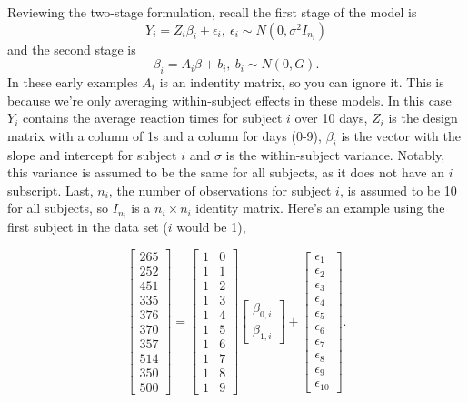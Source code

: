 \documentclass[
]{book}
\begin{document}
Reviewing the two-stage formulation, recall the first stage of the model is \[Y_i = Z_i\beta_i + \epsilon_i, \: \epsilon_i\sim N(0, \sigma^2I_{n_i})\] and the second stage is \[\beta_i = A_i \beta + b_i, \: b_i \sim N(0,G).\] In these early examples \(A_i\) is an indentity matrix, so you can ignore it. This is because we're only averaging within-subject effects in these models. In this case \(Y_i\) contains the average reaction times for subject \(i\) over 10 days, \(Z_i\) is the design matrix with a column of 1s and a column for days (0-9), \(\beta_i\) is the vector with the slope and intercept for subject \(i\) and \(\sigma\) is the within-subject variance. Notably, this variance is assumed to be the same for all subjects, as it does not have an \(i\) subscript. Last, \(n_i\), the number of observations for subject \(i\), is assumed to be 10 for all subjects, so \(I_{n_i}\) is a \(n_i\times n_i\) identity matrix. Here's an example using the first subject in the data set (\(i\) would be 1),

\[\left[\begin{array}{c}
265 \\ 252 \\ 451 \\ 335 \\ 376 \\370 \\ 357 \\ 514 \\ 350 \\ 500 \end{array}\right] = \left[\begin{array}{cc}
1 & 0 \\
1 & 1 \\
1 & 2 \\
1 & 3 \\
1 & 4 \\
1 & 5 \\
1 & 6 \\
1& 7 \\
1 & 8 \\
1 & 9 \end{array}\right]\left[\begin{array}{c} \beta_{0, i} \\ \beta_{1, i}  \end{array}\right] + 
\left[\begin{array}{c}
\epsilon_1 \\
\epsilon_2 \\
\epsilon_3 \\
\epsilon_4 \\
\epsilon_5 \\
\epsilon_6 \\
\epsilon_7 \\
\epsilon_8 \\
\epsilon_9 \\
\epsilon_{10} 
\end{array}\right].\]
\end{document}
